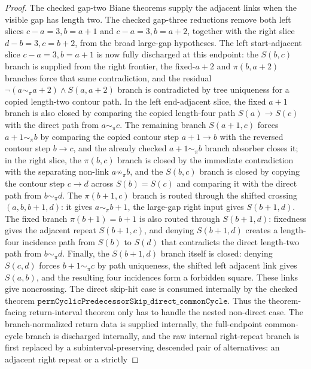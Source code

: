 \begin{proof}
  \leanok
  The checked gap-two Biane theorems supply the adjacent links when the visible
  gap has length two.  The checked gap-three reductions remove both left
  slices \(c-a=3,b=a+1\) and \(c-a=3,b=a+2\), together with the right slice
  \(d-b=3,c=b+2\), from the broad large-gap hypotheses.  The left
  start-adjacent slice \(c-a=3,b=a+1\) is now fully discharged at this
  endpoint: the \(S(b,c)\) branch is supplied from the right frontier, the
  fixed-\(a+2\) and \(\pi(b,a+2)\) branches force that same contradiction, and
  the residual \(\neg(a\sim_\pi a+2)\wedge S(a,a+2)\) branch is contradicted
  by tree uniqueness for a copied length-two contour path.  In the left
  end-adjacent slice, the fixed \(a+1\) branch is also closed by comparing the
  copied length-four path \(S(a)\to S(c)\) with the direct path from
  \(a\sim_\pi c\).  The remaining branch \(S(a+1,c)\) forces
  \(a+1\sim_\pi b\) by comparing the copied contour step \(a+1\to b\) with the
  reversed contour step \(b\to c\), and the already checked
  \(a+1\sim_\pi b\) branch absorber closes it;
  in the right slice, the \(\pi(b,c)\) branch is closed by the immediate
  contradiction with the separating non-link \(a\not\sim_\pi b\), and the
  \(S(b,c)\) branch is closed by copying the contour step \(c\to d\) across
  \(S(b)=S(c)\) and comparing it with the direct path from
  \(b\sim_\pi d\).  The \(\pi(b+1,c)\) branch is routed through the shifted
  crossing \((a,b,b+1,d)\): it gives \(a\sim_\pi b+1\), the large-gap right
  input gives \(S(b+1,d)\).  The fixed branch \(\pi(b+1)=b+1\) is also routed
  through \(S(b+1,d)\): fixedness gives the adjacent repeat \(S(b+1,c)\), and
  denying \(S(b+1,d)\) creates a length-four incidence path from \(S(b)\) to
  \(S(d)\) that contradicts the direct length-two path from \(b\sim_\pi d\).
  Finally, the \(S(b+1,d)\) branch itself is closed: denying \(S(c,d)\) forces
  \(b+1\sim_\pi c\) by path uniqueness, the shifted left adjacent link gives
  \(S(a,b)\), and the resulting four incidences form a forbidden square.
  These links give noncrossing.  The direct skip-hit case is consumed
  internally by the checked theorem
  \(\texttt{permCyclicPredecessorSkip\_direct\_commonCycle}\).  Thus the
  theorem-facing return-interval theorem only has to handle the nested
  non-direct case.  The branch-normalized return data is supplied internally,
  the full-endpoint common-cycle branch is discharged internally, and the raw
  internal right-repeat branch is first replaced by a subinterval-preserving
  descended pair of alternatives: an adjacent right repeat or a strictly

\end{proof}
